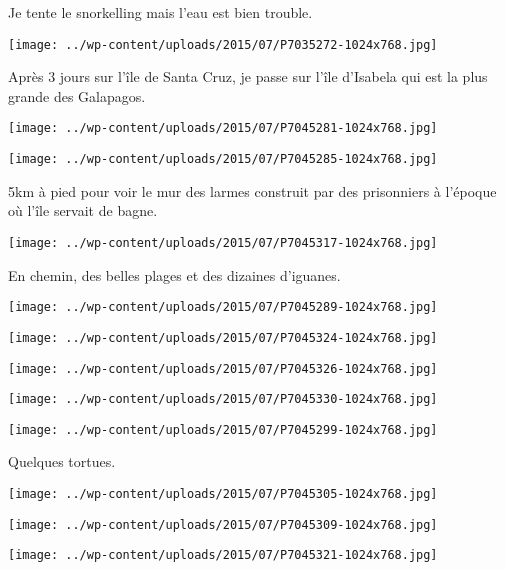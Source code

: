 Je tente le snorkelling mais l'eau est bien trouble. 
\begin{center} \texttt{[image: ../wp-content/uploads/2015/07/P7035272-1024x768.jpg]} \end{center}
\pagebreak

Après 3 jours sur l'île de Santa Cruz, je passe sur l'île d'Isabela qui est la plus grande des Galapagos. 
\begin{center} \texttt{[image: ../wp-content/uploads/2015/07/P7045281-1024x768.jpg]} \end{center}
\begin{center} \texttt{[image: ../wp-content/uploads/2015/07/P7045285-1024x768.jpg]} \end{center}
\pagebreak

5km à pied pour voir le mur des larmes construit par des prisonniers à l'époque où l'île servait de bagne. 
\begin{center} \texttt{[image: ../wp-content/uploads/2015/07/P7045317-1024x768.jpg]} \end{center}

En chemin, des belles plages et des dizaines d'iguanes. 
\begin{center} \texttt{[image: ../wp-content/uploads/2015/07/P7045289-1024x768.jpg]} \end{center}
\begin{center} \texttt{[image: ../wp-content/uploads/2015/07/P7045324-1024x768.jpg]} \end{center}
\begin{center} \texttt{[image: ../wp-content/uploads/2015/07/P7045326-1024x768.jpg]} \end{center}
\begin{center} \texttt{[image: ../wp-content/uploads/2015/07/P7045330-1024x768.jpg]} \end{center}
\begin{center} \texttt{[image: ../wp-content/uploads/2015/07/P7045299-1024x768.jpg]} \end{center}
\pagebreak

Quelques tortues. 
\begin{center} \texttt{[image: ../wp-content/uploads/2015/07/P7045305-1024x768.jpg]} \end{center}
\begin{center} \texttt{[image: ../wp-content/uploads/2015/07/P7045309-1024x768.jpg]} \end{center}
\begin{center} \texttt{[image: ../wp-content/uploads/2015/07/P7045321-1024x768.jpg]} \end{center}

